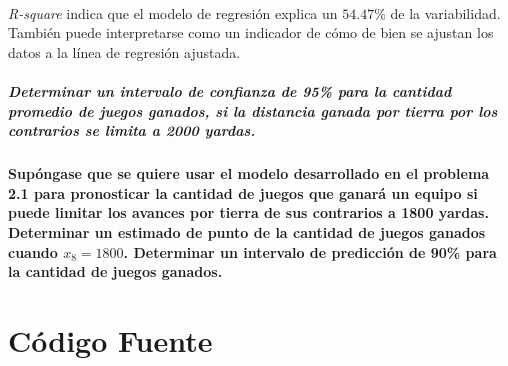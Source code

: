 \documentclass{article}
\begin{document}
  \paragraph{}
  \textit{R-square} indica que el modelo de regresión explica un $54.47\%$ de la variabilidad. También puede interpretarse como un indicador de cómo de bien se ajustan los datos a la línea de regresión ajustada.


  \subsubsection{Determinar un intervalo de confianza de 95\% para la cantidad promedio de juegos ganados, si la distancia ganada por tierra por los contrarios se limita a 2000 yardas.}

  \subsection{Supóngase que se quiere usar el modelo desarrollado en el problema 2.1 para pronosticar la cantidad de juegos que ganará un equipo si puede limitar los avances por tierra de sus contrarios a 1800 yardas. Determinar un estimado de punto de la cantidad de juegos ganados cuando $x_8=1800$. Determinar un intervalo de predicción de 90\% para la cantidad de juegos ganados.}

  \part{Código Fuente}
\end{document}
